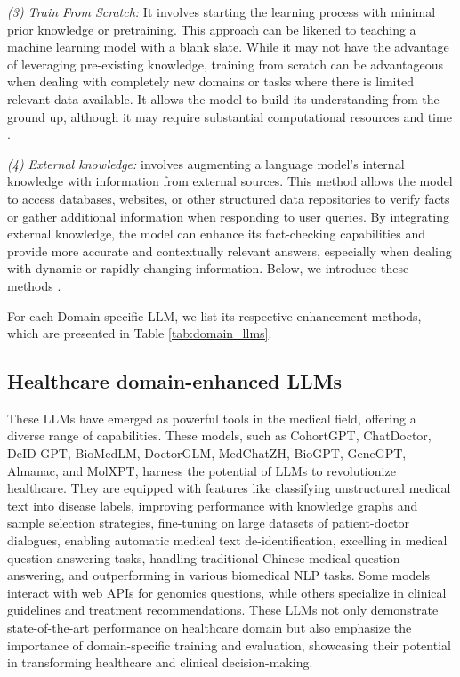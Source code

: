 \emph{(3) Train From Scratch:} It involves starting the learning process with minimal prior knowledge or pretraining. This approach can be likened to teaching a machine learning model with a blank slate. While it may not have the advantage of leveraging pre-existing knowledge, training from scratch can be advantageous when dealing with completely new domains or tasks where there is limited relevant data available. It allows the model to build its understanding from the ground up, although it may require substantial computational resources and time \citep{ross2022large,venigalla2022biomedlm}.

\emph{ (4)
External knowledge:} involves augmenting a language model's internal knowledge with information from external sources. This method allows the model to access databases, websites, or other structured data repositories to verify facts or gather additional information when responding to user queries. By integrating external knowledge, the model can enhance its fact-checking capabilities and provide more accurate and contextually relevant answers, especially when dealing with dynamic or rapidly changing information. Below, we introduce these methods \citep{wang2023augmenting,fan2023grammargpt}.

For each Domain-specific LLM, we list its respective enhancement methods, which are presented in Table \ref{tab:domain_llms}.


\subsection{Healthcare domain-enhanced LLMs} 
These LLMs have emerged as powerful tools in the medical field, offering a diverse range of capabilities. These models, such as CohortGPT\citep{guan2023cohortgpt}, ChatDoctor\citep{li2023chatdoctor}, DeID-GPT\citealp{liu2023deid}, BioMedLM\citealp{venigalla2022biomedlm}, DoctorGLM\citealp{DoctorGLM}, MedChatZH\citealp{tan2023medchatzh}, BioGPT\citep{luo2022biogpt}, GeneGPT\citep{jin2023genegpt}, Almanac\citep{hiesinger2023almanac}, and MolXPT\citep{liu2023molxpt}, harness the potential of LLMs to revolutionize healthcare. They are equipped with features like classifying unstructured medical text into disease labels, improving performance with knowledge graphs and sample selection strategies, fine-tuning on large datasets of patient-doctor dialogues, enabling automatic medical text de-identification, excelling in medical question-answering tasks, handling traditional Chinese medical question-answering, and outperforming in various biomedical NLP tasks. Some models interact with web APIs for genomics questions, while others specialize in clinical guidelines and treatment recommendations. These LLMs not only demonstrate state-of-the-art performance on healthcare domain but also emphasize the importance of domain-specific training and evaluation, showcasing their potential in transforming healthcare and clinical decision-making.


